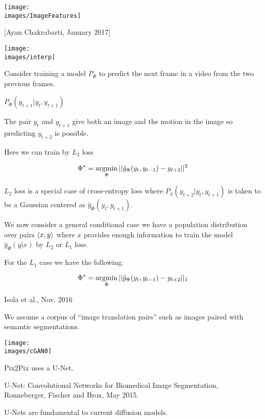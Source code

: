 {\centerline{\texttt{[image: \\images/ImageFeatures]}}


[Ayan Chakrabarti, January 2017]

\centerline{\texttt{[image: \\images/interp]}}


Consider training a model $P_\Phi$ to predict the next frame in a video from the two previous frames.

\vfill
$P_\Phi(y_{t+1}|y_t,y_{t+1})$

\vfill
The pair $y_t$ and $y_{t+1}$ give both an image and the motion in the image so predicting
$y_{t+2}$ is possible.


Here we can train by $L_2$ loss

$$\Phi^* = \operatorname*{argmin}_\Phi ||\hat{y}_\Phi(y_t,y_{t-1}) - y_{t+2}||^2$$

\vfill
$L_2$ loss is a special case of cross-entropy loss where $P_\phi(y_{t+2}|y_t,y_{t+1})$ is taken to be a Gaussian centered as
$\hat{y}_\Phi(y_t,y_{t+1})$.



We now consider a general conditional case we have a population distribution over pairs ${\mbox{$\langle x,y\rangle$}}$
where $x$ provides enough information to train the model $\hat{y}_\Phi(y|x)$ by $L_2$ or $L_1$ loss.

\vfill
For the $L_1$ case we have the following.

\vfill
$$\Phi^* = \operatorname*{argmin}_\Phi ||\hat{y}_\Phi(y_t,y_{t-1}) - y_{t+2}||_1$$

{Isola et al., Nov. 2016}

We assume a corpus of ``image translation pairs'' such as images paired with semantic segmentations.

\centerline{\texttt{[image: \\images/cGAN0]}}


Pix2Pix uses a U-Net.

\vfill
U-Net: Convolutional Networks for Biomedical Image Segmentation, Ronneberger, Fischer and Brox, May 2015.

\vfill
U-Nets are fundamental to current diffusion models.


}
